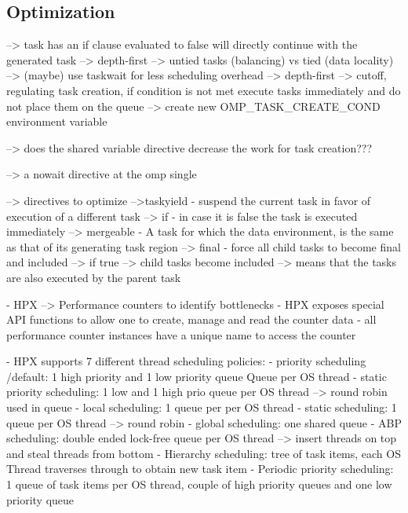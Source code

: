 \subsection{Optimization}
	
	\cite{LaGrone.2011}
	--> task has an if clause evaluated to false will directly continue with the generated task --> depth-first
	--> untied tasks (balancing) vs tied (data locality)
	--> (maybe) use taskwait for less scheduling overhead --> depth-first
	--> cutoff, regulating task creation, if condition is not met execute tasks immediately and do not place them on the queue
		--> create new OMP\_TASK\_CREATE\_COND environment variable
		
    --> does the shared variable directive decrease the work for task creation???
    
    --> a nowait directive at the omp single
    
    \cite{MKlemm.2018}
 --> directives to optimize
 	-->taskyield - suspend the current task in favor of execution of a different task
 	--> if - in case it is false the task is executed immediately
 	--> mergeable - A task for which the data environment, is the same as that of its generating task region
 	--> final - force all child tasks to become final and included
 		--> if true --> child tasks become included --> means that the tasks are also executed by the parent task

  \cite{TheSTEARGroup.2020}
    - HPX --> Performance counters to identify bottlenecks
    - HPX exposes special API functions to allow one to create, manage and read the counter data
    - all performance counter instances have a unique name to access the counter


  \cite{hpxMP.2019}
  \cite{TheSTEARGroup.2020}
    - HPX supports 7 different thread scheduling policies:
      - priority scheduling /default: 1 high priority and 1 low priority queue Queue per OS thread
      - static priority scheduling: 1 low and 1 high prio queue per OS thread --> round robin used in queue
      - local scheduling: 1 queue per per OS thread
      - static scheduling: 1 queue per OS thread --> round robin
      - global scheduling: one shared queue
      - ABP scheduling: double ended lock-free queue per OS thread --> insert threads on top and steal threads from bottom
      - Hierarchy scheduling: tree of task items, each OS Thread traverses through to obtain new task item
      - Periodic priority scheduling: 1 queue of task items per OS thread, couple of high priority queues and one low priority queue
      